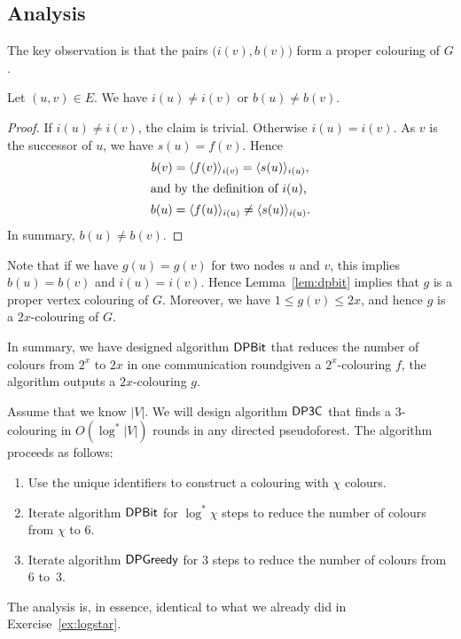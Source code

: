 \subsection{Analysis}

The key observation is that the pairs $\bigl(i(v), b(v)\bigr)$ form a proper colouring of $G$.
\begin{lemma}\label{lem:dpbit}
    Let $(u,v) \in E$. We have $i(u) \ne i(v)$ or $b(u) \ne b(v)$.
\end{lemma}
\begin{proof}
    If $i(u) \ne i(v)$, the claim is trivial. Otherwise $i(u) = i(v)$. As $v$ is the successor of $u$, we have $s(u) = f(v)$. Hence
    \begin{align*}
        b(v) &= \langle f(v) \rangle_{i(v)} = \langle s(u) \rangle_{i(u)}, \\
    \intertext{and by the definition of $i(u)$,}
        b(u) &= \langle f(u) \rangle_{i(u)} \ne \langle s(u) \rangle_{i(u)}.
    \end{align*}
    In summary, $b(u) \ne b(v)$.
\end{proof}

Note that if we have $g(u) = g(v)$ for two nodes $u$ and $v$, this implies $b(u) = b(v)$ and $i(u) = i(v)$. Hence Lemma~\ref{lem:dpbit} implies that $g$ is a proper vertex colouring of $G$. Moreover, we have $1 \le g(v) \le 2x$, and hence $g$ is a $2x$-colouring of $G$.

In summary, we have designed algorithm $\textsf{DPBit}$ that reduces the number of colours from $2^x$ to $2x$ in one communication round\mydash given a $2^x$-colouring $f$, the algorithm outputs a $2x$-colouring $g$.


\label{sec:dp3c}

Assume that we know $|V|$. We will design algorithm $\textsf{DP3C}$ that finds a $3$-colouring in $O(\log^* |V|)$ rounds in any directed pseudoforest. The algorithm proceeds as follows:
\begin{enumerate}
    \item Use the unique identifiers to construct a colouring with $\chi$ colours.
    \item Iterate algorithm $\textsf{DPBit}$ for $\log^* \chi$ steps to reduce the number of colours from $\chi$ to $6$.
    \item Iterate algorithm $\textsf{DPGreedy}$ for $3$ steps to reduce the number of colours from $6$ to~$3$.
\end{enumerate}
The analysis is, in essence, identical to what we already did in Exercise~\ref{ex:logstar}.


